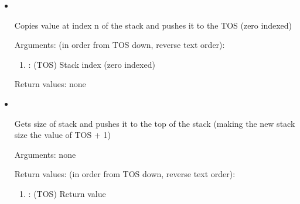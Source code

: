 \begin{itemize}
\noindent Return values: none

\item {}\ 

\noindent Copies value at index n of the stack and pushes it to the TOS (zero indexed)

\noindent Arguments: (in order from TOS down, reverse text order):
\begin{enumerate}
\item {}: (TOS) Stack index (zero indexed)
\end{enumerate}

\noindent Return values: none

\item {}\ 

\noindent Gets size of stack and pushes it to the top of the stack (making the new stack size the value of TOS + 1)

\noindent Arguments: none

\noindent Return values: (in order from TOS down, reverse text order):
\begin{enumerate}
\item {}: (TOS) Return value
\end{enumerate}

\end{itemize}

